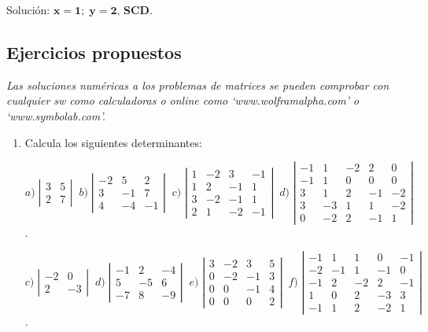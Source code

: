 \begin{proofw}
 Solución: $\boldsymbol{x=1; \; y=2} $, \textbf{SCD}.

\end{proofw}


\subsection{Ejercicios propuestos}

\justify


\textcolor{gris}{\emph{Las soluciones numéricas a los problemas de matrices se pueden comprobar con cualquier sw como calculadoras o online como `www.wolframalpha.com' o `www.symbolab.com'.}}

\begin{enumerate}

\item Calcula los siguientes determinantes:

\hspace{-5mm} \footnotesize{$a)\; \left| \begin{matrix} 3&5\\2&7 \end{matrix} \right|\; \; b)\; \left| \begin{matrix} -2&5&2\\3&-1&7\\4&-4&-1 \end{matrix} \right|\; \; c)\; \left| \begin{matrix} 1&-2&3&-1\\1&2&-1&1\\3&-2&-1&1\\2&1&-2&-1 \end{matrix} \right|\; \; d)\; \left| \begin{matrix} -1&1&-2&2&0\\-1&1&0&0&0\\3&1&2&-1&-2\\3&-3&1&1&-2\\0&-2&2&-1&1 \end{matrix} \right|$}\normalsize{.}

\hspace{-5mm} \footnotesize{$c)\; \left| \begin{matrix} -2&0\\2&-3 \end{matrix} \right|\; \; d)\; \left| \begin{matrix} -1&2&-4\\5&-5&6\\-7&8&-9 \end{matrix} \right|\; \; e)\; \left| \begin{matrix} 3&-2&3&5\\0&-2&-1&3\\0&0&-1&4\\0&0&0&2 \end{matrix} \right|\; \; f)\; \left| \begin{matrix} -1&1&1&0&-1\\-2&-1&1&-1&0\\-1&2&-2&2&-1\\1&0&2&-3&3\\-1&1&2&-2&1 \end{matrix} \right|$}\normalsize{.}


\end{enumerate}

